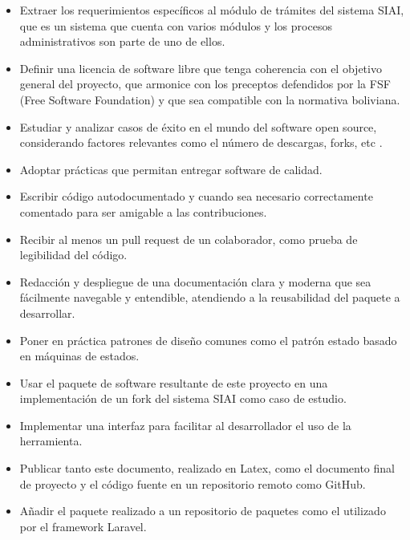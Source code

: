 \begin{itemize}
	\item Extraer los requerimientos específicos al módulo de trámites del
		sistema SIAI, que es un sistema que cuenta con varios módulos y los
		procesos administrativos son parte de uno de ellos.
	
	\item Definir una licencia de software libre que tenga coherencia con el
		objetivo general del proyecto, que armonice con los preceptos defendidos
		por la FSF (Free Software Foundation) y que sea compatible con la
		normativa boliviana.
	
	\item Estudiar y analizar casos de éxito en el mundo del software open
		source, considerando factores relevantes como el número de descargas,
		forks, etc \cite{mujahidWhatAreCharacteristics2023}. 
	
	\item Adoptar prácticas que permitan entregar software de calidad.
	
	\item Escribir código autodocumentado y cuando sea necesario correctamente
		comentado para ser amigable a las contribuciones.
	
	\item Recibir al menos un pull request de un colaborador, como prueba de
		legibilidad del código.
	
	\item Redacción y despliegue de una documentación clara y moderna que sea
		fácilmente navegable y entendible, atendiendo a la reusabilidad del
		paquete a desarrollar.
	
	\item Poner en práctica patrones de diseño comunes como el patrón estado
		basado en máquinas de estados.
	
	\item Usar el paquete de software resultante de este proyecto en una
		implementación de un fork del sistema SIAI como caso de estudio.
	
	\item Implementar una interfaz para facilitar al desarrollador el uso de la
		herramienta.
	
	\item Publicar tanto este documento, realizado en Latex, como el documento
		final de proyecto y el código fuente en un repositorio remoto como
		GitHub.
	
	\item Añadir el paquete realizado a un repositorio de paquetes como el
		utilizado por el framework Laravel.
	

\end{itemize}
